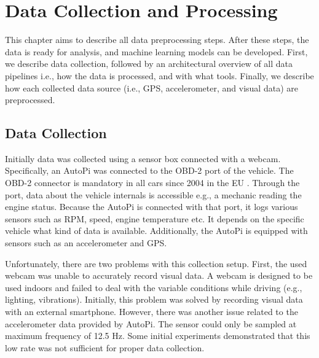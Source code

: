 \clearpage
\section{Data Collection and Processing}
\label{sec:data-processing}

This chapter aims to describe all data preprocessing steps. After these steps, the data is ready for analysis, and machine learning models can be developed. First, we describe data collection, followed by an architectural overview of all data pipelines i.e., how the data is processed, and with what tools. Finally, we describe how each collected data source (i.e., GPS, accelerometer, and visual data) are preprocessed. 


\subsection{Data Collection}
\label{sec:data-collection}

Initially data was collected using a sensor box connected with a webcam. Specifically, an AutoPi \cite{AutoPi} was connected to the OBD-2 port of the vehicle. The OBD-2 connector is mandatory in all cars since 2004 in the EU \cite{EU1998}. Through the port, data about the vehicle internals is accessible e.g., a mechanic reading the engine status. Because the AutoPi is connected with that port, it logs various sensors such as RPM, speed, engine temperature etc. It depends on the specific vehicle what kind of data is available. Additionally, the AutoPi is equipped with sensors such as an accelerometer and GPS.

Unfortunately, there are two problems with this collection setup. First, the used webcam was unable to accurately record visual data. A webcam is designed to be used indoors and failed to deal with the variable conditions while driving (e.g., lighting, vibrations). Initially, this problem was solved by recording visual data with an external smartphone. However, there was another issue related to the accelerometer data provided by AutoPi. The sensor could only be sampled at maximum frequency of 12.5 Hz. Some initial experiments demonstrated that this low rate was not sufficient for proper data collection.

